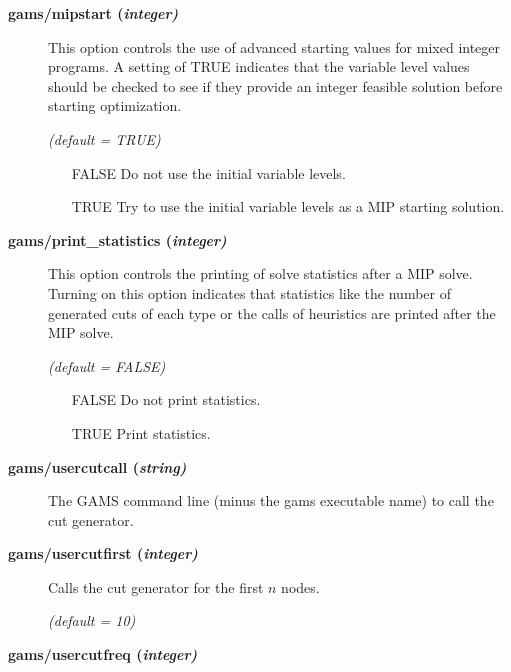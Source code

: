 \begin{description}
\item[\label{scipmipstart}\hypertarget{scipmipstart}
{\textbf{gams/mipstart (\slshape{integer})}}]\hspace{1.0in}

This option controls the use of advanced starting values for mixed integer programs.
A setting of TRUE indicates that the variable level values should be checked to see if they provide an integer feasible solution before starting optimization.

\textsl{(default = TRUE)}
\begin{itemize}
\item[FALSE] Do not use the initial variable levels.
\item[TRUE] Try to use the initial variable levels as a MIP starting solution.
\end{itemize}


\item[\label{scipprintstat}\hypertarget{scipprintstat}
{\textbf{gams/print\_statistics (\slshape{integer})}}]\hspace{1.0in}

This option controls the printing of solve statistics after a MIP solve.
Turning on this option indicates that statistics like the number of
generated cuts of each type or the calls of heuristics are printed after the
MIP solve.

\textsl{(default = FALSE)}
\begin{itemize}
\item[FALSE] Do not print statistics.
\item[TRUE] Print statistics.
\end{itemize}


\item[\label{scipusercutcall}\hypertarget{scipusercutcall}
{\textbf{gams/usercutcall (\slshape{string})}}]\hspace{1.0in}

The GAMS command line (minus the gams executable name) to call the cut generator.


\item[\label{scipusercutfirst}\hypertarget{scipusercutfirst}
{\textbf{gams/usercutfirst (\slshape{integer})}}]\hspace{1.0in}

Calls the cut generator for the first $n$ nodes.

\textsl{(default = 10)}

\item[\label{scipusercutfreq}\hypertarget{scipusercutfreq}
{\textbf{gams/usercutfreq (\slshape{integer})}}]\hspace{1.0in}


\end{description}
